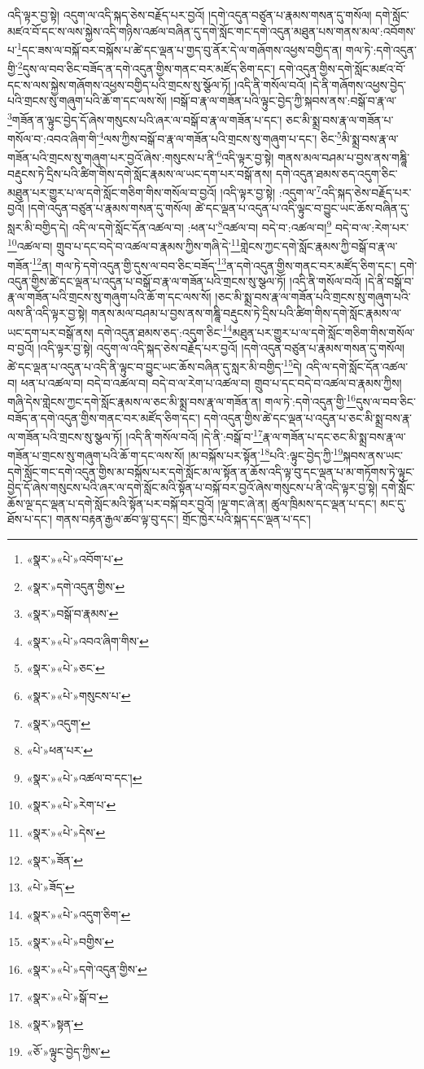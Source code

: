 འདི་ལྟར་བྱ་སྟེ། འདུག་ལ་འདི་སྐད་ཅེས་བརྗོད་པར་བྱའོ། །དགེ་འདུན་བཙུན་པ་རྣམས་གསན་དུ་གསོལ། དགེ་སློང་མཛའ་བོ་དང་ས་ལས་སྐྱེས་འདི་གཉིས་འཚལ་བཞིན་དུ་དགེ་སློང་གང་དགེ་འདུན་མཐུན་པས་གནས་མལ་:འབོགས་པ་\footnote{«སྣར་»«པེ་»འབོག་པ་}དང་ཟས་ལ་བསྐོ་བར་བསྐོས་པ་ཚེ་དང་ལྡན་པ་གྱད་བུ་ནོར་དེ་ལ་གཞོགས་འཕྱས་བགྱིད་ན། གལ་ཏེ་:དགེ་འདུན་གྱི་\footnote{«སྣར་»དགེ་འདུན་གྱིས་}དུས་ལ་བབ་ཅིང་བཟོད་ན་དགེ་འདུན་གྱིས་གནང་བར་མཛོད་ཅིག་དང་། དགེ་འདུན་གྱིས་དགེ་སློང་མཛའ་བོ་དང་ས་ལས་སྐྱེས་གཞོགས་འཕྱས་བགྱིད་པའི་གྲངས་སུ་སྩོལ་ཏོ། །འདི་ནི་གསོལ་བའོ། །དེ་ནི་གཞོགས་འཕྱས་བྱེད་པའི་གྲངས་སུ་གཞུག་པའི་ཆོ་ག་དང་ལས་སོ། །བསྒོ་བ་རྣ་ལ་གཟོན་པའི་ལྟུང་བྱེད་ཀྱི་སྐབས་ནས་:བསྒོ་བ་རྣ་ལ་\footnote{«སྣར་»བསྒོ་བ་རྣམས་}གཟོན་ན་ལྟུང་བྱེད་དོ་ཞེས་གསུངས་པའི་ཞར་ལ་བསྒོ་བ་རྣ་ལ་གཟོན་པ་དང་། ཅང་མི་སྨྲ་བས་རྣ་ལ་གཟོན་པ་གསོལ་བ་:འབའ་ཞིག་གི་\footnote{«སྣར་»«པེ་»འབའ་ཞིག་གིས་}ལས་ཀྱིས་བསྒོ་བ་རྣ་ལ་གཟོན་པའི་གྲངས་སུ་གཞུག་པ་དང་། ཅིང་\footnote{«སྣར་»«པེ་»ཅང་}མི་སྨྲ་བས་རྣ་ལ་གཟོན་པའི་གྲངས་སུ་གཞུག་པར་བྱའོ་ཞེས་:གསུངས་པ་ནི་\footnote{«སྣར་»«པེ་»གསུངས་པ་}འདི་ལྟར་བྱ་སྟེ། གནས་མལ་བཤམ་པ་བྱས་ནས་གཎྜཱི་བརྡུངས་ཏེ་དྲིས་པའི་ཚིག་གིས་དགེ་སློང་རྣམས་ལ་ཡང་དག་པར་བསྒོ་ནས། དགེ་འདུན་ཐམས་ཅད་འདུག་ཅིང་མཐུན་པར་གྱུར་པ་ལ་དགེ་སློང་གཅིག་གིས་གསོལ་བ་བྱའོ། །འདི་ལྟར་བྱ་སྟེ། :འདུག་ལ་\footnote{«སྣར་»འདུག་}འདི་སྐད་ཅེས་བརྗོད་པར་བྱའོ། །དགེ་འདུན་བཙུན་པ་རྣམས་གསན་དུ་གསོལ། ཚེ་དང་ལྡན་པ་འདུན་པ་འདི་ལྟུང་བ་བྱུང་ཡང་ཆོས་བཞིན་དུ་སླར་མི་བགྱིད་དེ། འདི་ལ་དགེ་སློང་དོན་འཚལ་བ། :ཕན་པ་\footnote{«པེ་»ཕན་པར་}འཚལ་བ། བདེ་བ་:འཚལ་བ།\footnote{«སྣར་»«པེ་»འཚལ་བ་དང་།} བདེ་བ་ལ་:རེག་པར་\footnote{«སྣར་»«པེ་»རེག་པ་}འཚལ་བ། གྲུབ་པ་དང་བདེ་བ་འཚལ་བ་རྣམས་ཀྱིས་གཞི་དེ་\footnote{«སྣར་»«པེ་»དེས་}གླེངས་ཀྱང་དགེ་སློང་རྣམས་ཀྱི་བསྒོ་བ་རྣ་ལ་གཟོན་\footnote{«སྣར་»ཟོན་}ན། གལ་ཏེ་དགེ་འདུན་གྱི་དུས་ལ་བབ་ཅིང་བཟོད་\footnote{«པེ་»ཟོད་}ན་དགེ་འདུན་གྱིས་གནང་བར་མཛོད་ཅིག་དང་། དགེ་འདུན་གྱིས་ཚེ་དང་ལྡན་པ་འདུན་པ་བསྒོ་བ་རྣ་ལ་གཟོན་པའི་གྲངས་སུ་སྩལ་ཏོ། །འདི་ནི་གསོལ་བའོ། །དེ་ནི་བསྒོ་བ་རྣ་ལ་གཟོན་པའི་གྲངས་སུ་གཞུག་པའི་ཆོ་ག་དང་ལས་སོ། །ཅང་མི་སྨྲ་བས་རྣ་ལ་གཟོན་པའི་གྲངས་སུ་གཞུག་པའི་ལས་ནི་འདི་ལྟར་བྱ་སྟེ། གནས་མལ་བཤམ་པ་བྱས་ནས་གཎྜཱི་བརྡུངས་ཏེ་དྲིས་པའི་ཚིག་གིས་དགེ་སློང་རྣམས་ལ་ཡང་དག་པར་བསྒོ་ནས། དགེ་འདུན་ཐམས་ཅད་:འདུག་ཅིང་\footnote{«སྣར་»«པེ་»འདུག་ཅིག་}མཐུན་པར་གྱུར་པ་ལ་དགེ་སློང་གཅིག་གིས་གསོལ་བ་བྱའོ། །འདི་ལྟར་བྱ་སྟེ། འདུག་ལ་འདི་སྐད་ཅེས་བརྗོད་པར་བྱའོ། །དགེ་འདུན་བཙུན་པ་རྣམས་གསན་དུ་གསོལ། ཚེ་དང་ལྡན་པ་འདུན་པ་འདི་ནི་ལྟུང་བ་བྱུང་ཡང་ཆོས་བཞིན་དུ་སླར་མི་བགྱིད་\footnote{«སྣར་»«པེ་»བགྱིས་}དེ། འདི་ལ་དགེ་སློང་དོན་འཚལ་བ། ཕན་པ་འཚལ་བ། བདེ་བ་འཚལ་བ། བདེ་བ་ལ་རེག་པ་འཚལ་བ། གྲུབ་པ་དང་བདེ་བ་འཚལ་བ་རྣམས་ཀྱིས། གཞི་དེས་གླེངས་ཀྱང་དགེ་སློང་རྣམས་ལ་ཅང་མི་སྨྲ་བས་རྣ་ལ་གཟོན་ན། གལ་ཏེ་:དགེ་འདུན་གྱི་\footnote{«སྣར་»«པེ་»དགེ་འདུན་གྱིས་}དུས་ལ་བབ་ཅིང་བཟོད་ན་དགེ་འདུན་གྱིས་གནང་བར་མཛོད་ཅིག་དང་། དགེ་འདུན་གྱིས་ཚེ་དང་ལྡན་པ་འདུན་པ་ཅང་མི་སྨྲ་བས་རྣ་ལ་གཟོན་པའི་གྲངས་སུ་སྩལ་ཏོ། །འདི་ནི་གསོལ་བའོ། །དེ་ནི་:བསྒོ་བ་\footnote{«སྣར་»«པེ་»སྒོ་བ་}རྣ་ལ་གཟོན་པ་དང་ཅང་མི་སྨྲ་བས་རྣ་ལ་གཟོན་པ་གྲངས་སུ་གཞུག་པའི་ཆོ་ག་དང་ལས་སོ། །མ་བསྐོས་པར་སྟོན་\footnote{«སྣར་»སྟན་}པའི་:ལྟུང་བྱེད་ཀྱི་\footnote{«ཅོ་»ལྟུང་བྱེད་ཀྱིས་}སྐབས་ནས་ཡང་དགེ་སློང་གང་དགེ་འདུན་གྱིས་མ་བསྐོས་པར་དགེ་སློང་མ་ལ་སྟོན་ན་ཆོས་འདི་ལྟ་བུ་དང་ལྡན་པ་མ་གཏོགས་ཏེ་ལྟུང་བྱེད་དོ་ཞེས་གསུངས་པའི་ཞར་ལ་དགེ་སློང་མའི་སྟོན་པ་བསྐོ་བར་བྱའོ་ཞེས་གསུངས་པ་ནི་འདི་ལྟར་བྱ་སྟེ། དགེ་སློང་ཆོས་ལྔ་དང་ལྡན་པ་དགེ་སློང་མའི་སྟོན་པར་བསྐོ་བར་བྱའོ། །ལྔ་གང་ཞེ་ན། ཚུལ་ཁྲིམས་དང་ལྡན་པ་དང་། མང་དུ་ཐོས་པ་དང་། གནས་བརྟན་རྒྱལ་ཚབ་ལྟ་བུ་དང་། གྲོང་ཁྱེར་པའི་སྐད་དང་ལྡན་པ་དང་། 